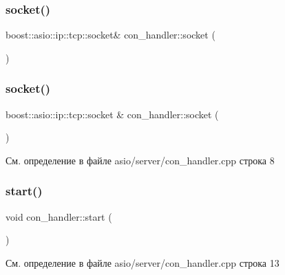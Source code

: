 \mbox{\label{classcon__handler_ad1cbd939db0c1c543425d7cd53702a06}} 
\subsubsection{\texorpdfstring{socket()}{socket()}\hspace{0.1cm}{\footnotesize\ttfamily [1/2]}}
{\footnotesize\ttfamily boost\+::asio\+::ip\+::tcp\+::socket\& con\+\_\+handler\+::socket (\begin{DoxyParamCaption}{ }\end{DoxyParamCaption})}

\mbox{\label{classcon__handler_ad168c799678add9fb23f3379e1d42b22}} 
\subsubsection{\texorpdfstring{socket()}{socket()}\hspace{0.1cm}{\footnotesize\ttfamily [2/2]}}
{\footnotesize\ttfamily boost\+::asio\+::ip\+::tcp\+::socket \& con\+\_\+handler\+::socket (\begin{DoxyParamCaption}{ }\end{DoxyParamCaption})}



См. определение в файле asio/server/con\+\_\+handler.\+cpp строка 8

\mbox{\label{classcon__handler_a02d6691e226a75525a2ac83062b5c7f7}} 
\subsubsection{\texorpdfstring{start()}{start()}\hspace{0.1cm}{\footnotesize\ttfamily [1/2]}}
{\footnotesize\ttfamily void con\+\_\+handler\+::start (\begin{DoxyParamCaption}{ }\end{DoxyParamCaption})}



См. определение в файле asio/server/con\+\_\+handler.\+cpp строка 13

